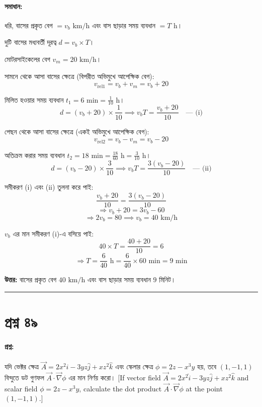 \documentclass{article}
\begin{document}
\paragraph{সমাধান:}

ধরি, বাসের প্রকৃত বেগ $= v_b\text{ km/h}$ এবং বাস ছাড়ার সময় ব্যবধান $= T\text{ h}$।

দুটি বাসের মধ্যবর্তী দূরত্ব $d = v_b \times T$।

মোটরসাইকেলের বেগ $v_m = 20\text{ km/h}$।

সামনে থেকে আসা বাসের ক্ষেত্রে (বিপরীত অভিমুখে আপেক্ষিক বেগ):
$$v_{\text{rel1}} = v_b + v_m = v_b + 20$$

মিলিত হওয়ার সময় ব্যবধান $t_1 = 6\text{ min} = \frac{1}{10}\text{ h}$।
$$d = (v_b + 20) \times \frac{1}{10} \implies v_b T = \frac{v_b + 20}{10} \quad \text{--- (i)}$$

পেছন থেকে আসা বাসের ক্ষেত্রে (একই অভিমুখে আপেক্ষিক বেগ):
$$v_{\text{rel2}} = v_b - v_m = v_b - 20$$

অতিক্রম করার সময় ব্যবধান $t_2 = 18\text{ min} = \frac{18}{60}\text{ h} = \frac{3}{10}\text{ h}$।
$$d = (v_b - 20) \times \frac{3}{10} \implies v_b T = \frac{3(v_b - 20)}{10} \quad \text{--- (ii)}$$

সমীকরণ (i) এবং (ii) তুলনা করে পাই:
$$\frac{v_b + 20}{10} = \frac{3(v_b - 20)}{10}$$
$$\Rightarrow v_b + 20 = 3v_b - 60$$
$$\Rightarrow 2v_b = 80 \implies v_b = 40\text{ km/h}$$

$v_b$ এর মান সমীকরণ (i)-এ বসিয়ে পাই:
$$40 \times T = \frac{40 + 20}{10} = 6$$
$$\Rightarrow T = \frac{6}{40}\text{ h} = \frac{6}{40} \times 60\text{ min} = 9\text{ min}$$

\textbf{উত্তর:} বাসের প্রকৃত বেগ $40\text{ km/h}$ এবং বাস ছাড়ার সময় ব্যবধান $9\text{ মিনিট}$।

\vspace{1cm}
\hrule
\vspace{1cm}

\section*{প্রশ্ন ৪৯}

\paragraph{প্রশ্ন:} 
যদি ভেক্টর ক্ষেত্র $\vec{A} = 2x^2\hat{i} - 3yz\hat{j} + xz^2\hat{k}$ এবং স্কেলার ক্ষেত্র $\phi = 2z - x^3y$ হয়, তবে $(1, -1, 1)$ বিন্দুতে ডট গুণফল $\vec{A} \cdot \vec{\nabla}\phi$ এর মান নির্ণয় করো। 
[If vector field $\vec{A} = 2x^2\hat{i} - 3yz\hat{j} + xz^2\hat{k}$ and scalar field $\phi = 2z - x^3y$, calculate the dot product $\vec{A} \cdot \vec{\nabla}\phi$ at the point $(1, -1, 1)$.]
\end{document}
